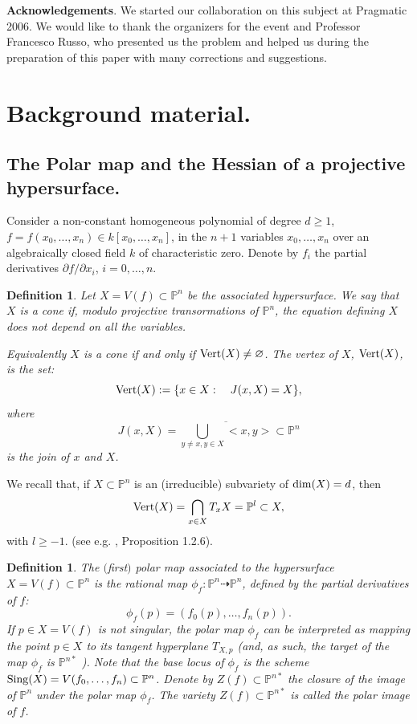 \documentclass[11pt,a4paper]{amsart}
\newtheorem{defi}[theorem]{Definition}
\newcommand{\PP}{ \mathbb{P}}
\begin{document}
{\bf Acknowledgements}.
We started our collaboration on this subject at Pragmatic 2006.
We would like to thank the organizers for the event and
  Professor Francesco Russo, who presented us the
problem and helped us during the preparation of this paper with
many corrections and suggestions.


\section{Background material.}

\subsection{The Polar map and the Hessian  of a projective hypersurface.}

Consider a non-constant homogeneous polynomial of degree $d\geq
1$, $f=f(x_0,\ldots,x_n)\in k[x_0, \ldots, x_n]$, in the $n+1$
variables $x_0, \ldots, x_n$ over an algebraically closed field
$k$ of characteristic zero. Denote by $f_i$  the partial
derivatives $\partial f/\partial x_i$, $i=0,\ldots ,n$.

\begin{defi}{\em Let $X=V(f)\subset\PP^n$ be the associated  hypersurface. We say that $X$
is a {\it cone} if, modulo projective transormations of  $\mathbb{P}^n$, the equation defining $X$ does not depend on all the  variables.

 Equivalently $X$ is a cone if and only if ${\rm Vert}(X)\neq\varnothing$. The {\it vertex of $X$}, ${\rm Vert}(X)$, is the set:
$${\rm Vert}(X):=\{ x\in X:\quad J(x,X)=X\},$$
where
 $$J(x,X)=\overline{\bigcup_{y\neq x, y\in X}<x,y>}\subset \mathbb{P}^n$$
 is {\it the join of $x$ and $X$}.
}\end{defi}
We recall that, if $X\subset\mathbb{P}^n$ is an (irreducible) subvariety of ${\rm dim}(X)=d$, then
$${\rm Vert}(X)=\bigcap_{x\in X}T_xX=\mathbb{P}^l\subset X,$$
with $l\geq -1$. (see e.g. \cite{Russo}, Proposition 1.2.6).


\begin{defi}{\em The {\it $($first$)$ polar map} associated to the hypersurface $X=V(f)\subset\mathbb{P}^n$ is the rational map
$\phi_f:\mathbb{P}^n\dashrightarrow\mathbb{P}^n$, defined by the partial derivatives of $f$:
$$\phi_f(p)= (f_0(p), \ldots, f_n(p)).$$
If $p\in X=V(f)$ is not singular, the polar map $\phi_f$ can be
interpreted as mapping the point $p\in X$  to its tangent
hyperplane $T_{X,p}$ (and, as such, the target of the map $\phi_f$
is $\mathbb{P}^{n*}$ ). Note that the base locus of $\phi_f$ is
the scheme ${\rm Sing}(X)=V(f_0, \ldots, f_n) \subset\PP^n$.
Denote by $Z(f)\subset\PP^{n*}$ the closure of the image of
$\mathbb{P}^n$ under the polar map $\phi_f$. The variety
$Z(f)\subset\mathbb{P}^{n*}$  is called the { \it polar image} of
$f$.}\end{defi}
\end{document}
